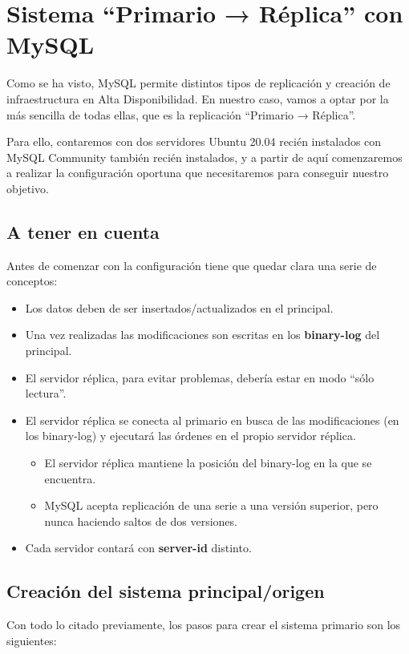 \section{Sistema “Primario → Réplica” con MySQL}
Como se ha visto, MySQL permite distintos tipos de replicación y creación de infraestructura en Alta Disponibilidad. En nuestro caso, vamos a optar por la más sencilla de todas ellas, que es la replicación “Primario → Réplica”.

Para ello, contaremos con dos servidores Ubuntu 20.04 recién instalados con MySQL Community también recién instalados, y a partir de aquí comenzaremos a realizar la configuración oportuna que necesitaremos para conseguir nuestro objetivo.


\subsection{A tener en cuenta}
Antes de comenzar con la configuración tiene que quedar clara una serie de conceptos:

\begin{itemize}
    \item Los datos deben de ser insertados/actualizados en el principal.
    \item Una vez realizadas las modificaciones son escritas en los \textbf{binary-log} del principal.
    \item El servidor réplica, para evitar problemas, debería estar en modo “sólo lectura”.
    \item El servidor réplica se conecta al primario en busca de las modificaciones (en los binary-log) y ejecutará las órdenes en el propio servidor réplica.
    \begin{itemize}
        \item El servidor réplica mantiene la posición del binary-log en la que se encuentra.
        \item MySQL acepta replicación de una serie a una versión superior, pero nunca haciendo saltos de dos versiones.
    \end{itemize}
    \item Cada servidor contará con \textbf{server-id} distinto.
\end{itemize}

\subsection{Creación del sistema principal/origen}
Con todo lo citado previamente, los pasos para crear el sistema primario son los siguientes:

